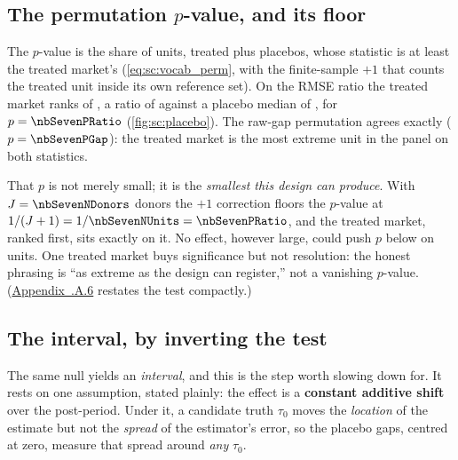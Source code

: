 \subsection*{The permutation \texorpdfstring{$p$}{p}-value, and its floor}

The $p$-value is the share of units, treated plus placebos, whose statistic is at least the treated
market's (\cref{eq:sc:vocab_perm}, with the finite-sample $+1$ that counts the treated unit inside its
own reference set). On the RMSE ratio the treated market ranks \nbSevenTreatedRank{} of
\nbSevenNUnits{}, a ratio of \nbSevenTreatedRatio{} against a placebo median of
\nbSevenPlaceboMedianRatio{}, for $p = \nbSevenPRatio$ (\cref{fig:sc:placebo}). The raw-gap
permutation agrees exactly ($p = \nbSevenPGap$): the treated market is the most extreme unit in the
panel on both statistics.

That $p$ is not merely small; it is the \emph{smallest this design can produce}. With
$J = \nbSevenNDonors$ donors the $+1$ correction floors the $p$-value at
$1/(J+1) = 1/\nbSevenNUnits = \nbSevenPRatio$, and the treated market, ranked first, sits exactly on
it. No effect, however large, could push $p$ below \nbSevenPRatio{} on \nbSevenNUnits{} units. One
treated market buys significance but not resolution: the honest phrasing is ``as extreme as the design
can register,'' not a vanishing $p$-value.
(\hyperref[app:sc:perm]{Appendix~\thechapter.A.6} restates the test compactly.)



\subsection*{The interval, by inverting the test}

The same null yields an \emph{interval}, and this is the step worth slowing down for. It rests on one
assumption, stated plainly: the effect is a \textbf{constant additive shift} over the post-period.
Under it, a candidate truth $\tau_0$ moves the \emph{location} of the estimate but not the
\emph{spread} of the estimator's error, so the placebo gaps, centred at zero, measure that spread
around \emph{any} $\tau_0$.


